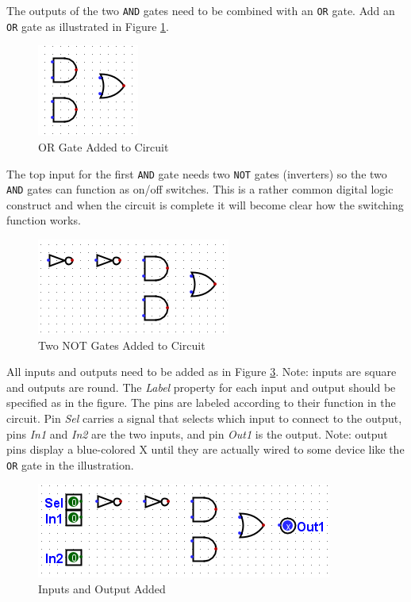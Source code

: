 The outputs of the two \texttt{AND} gates need to be combined with an \texttt{OR} gate. Add an \texttt{OR} gate as illustrated in Figure \ref{fig:01-04}.

\begin{figure}[H]
	\centering
	\includegraphics[width=\maxwidth{.95\linewidth}]{gfx/01-04}
	\caption{OR Gate Added to Circuit}
	\label{fig:01-04}
\end{figure}

The top input for the first \texttt{AND} gate needs two \texttt{NOT} gates (inverters) so the two \texttt{AND} gates can function as on/off switches. This is a rather common digital logic construct and when the circuit is complete it will become clear how the switching function works.

\begin{figure}[H]
	\centering
	\includegraphics[width=\maxwidth{.95\linewidth}]{gfx/01-05}
	\caption{Two NOT Gates Added to Circuit}
	\label{fig:01-05}
\end{figure}

All inputs and outputs need to be added as in Figure \ref{fig:01-06}. Note: inputs are square and outputs are round. The \textit{Label} property for each input and output should be specified as in the figure. The pins are labeled according to their function in the circuit. Pin \textit{Sel} carries a signal that selects which input to connect to the output, pins \textit{In1} and \textit{In2} are the two inputs, and pin \textit{Out1} is the output. Note: output pins display a blue-colored \textsf{X} until they are actually wired to some device like the \texttt{OR} gate in the illustration.
 
\begin{figure}[H]
	\centering
	\includegraphics[width=\maxwidth{.95\linewidth}]{gfx/01-06}
	\caption{Inputs and Output Added}
	\label{fig:01-06}
\end{figure}

